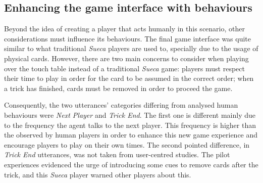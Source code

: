 \subsection{Enhancing the game interface with behaviours}

Beyond the idea of creating a player that acts humanly in this scenario, other considerations must influence its behaviours.
The final game interface was quite similar to what traditional \emph{Sueca} players are used to, specially due to the usage of physical cards.
However, there are two main concerns to consider when playing over the touch table instead of a traditional \emph{Sueca} game: players must respect their time to play in order for the card to be assumed in the correct order; when a trick has finished, cards must be removed in order to proceed the game.

Consequently, the two utterances' categories differing from analysed human behaviours were \emph{Next Player} and \emph{Trick End}.
The first one is different mainly due to the frequency the agent talks to the next player.
This frequency is higher than the observed by human players in order to enhance this new game experience and encourage players to play on their own times.
The second pointed difference, in \emph{Trick End} utterances, was not taken from user-centred studies.
The pilot experiences evidenced the urge of introducing some cues to remove cards after the trick, and this \emph{Sueca} player warned other players about this.
